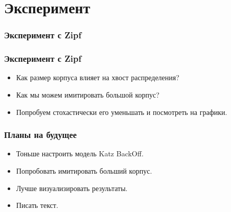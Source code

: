 \documentclass[14pt]{beamer}
\begin{document}
\section{Эксперимент}

\begin{frame}
	\frametitle{Эксперимент с Zipf}
	
	\begin{figure}[h]
	\end{figure}
\end{frame}


\begin{frame}
	\frametitle{Эксперимент с Zipf}
	
	\begin{itemize}
		\item Как размер корпуса влияет на хвост распределения?
		
		\item Как мы можем имитировать большой корпус?
		
		\item Попробуем стохастически его уменьшать и посмотреть на графики.
	\end{itemize}
	
\end{frame}
\begin{frame}
	\frametitle{Планы на будущее}
	
	\begin{itemize}
		\item Тоньше настроить модель Katz BackOff.
		\item Попробовать имитировать больший корпус.
		\item Лучше визуализировать результаты.
		\item Писать текст.
	\end{itemize}
\end{frame}
\end{document}
